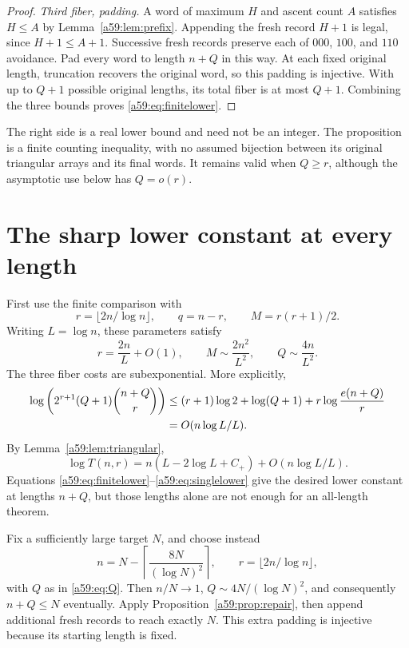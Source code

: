 \documentclass[11pt,letterpaper]{article}
\theoremstyle{remark}\newtheorem{remark}[theorem]{Remark}
\theoremstyle{remark}\newtheorem{wremark}{Remark}\renewcommand{\thewremark}{W\arabic{wremark}}
\theoremstyle{plain}\newtheorem{wcorollary}[wremark]{Corollary}
\begin{document}
\begin{proof}
\emph{Third fiber, padding.} A word of maximum $H$ and ascent count $A$ satisfies $H\le A$ by Lemma~\ref{a59:lem:prefix}. Appending the fresh record $H+1$ is legal, since $H+1\le A+1$. Successive fresh records preserve each of $000$, $100$, and $110$ avoidance. Pad every word to length $n+Q$ in this way. At each fixed original length, truncation recovers the original word, so this padding is injective. With up to $Q+1$ possible original lengths, its total fiber is at most $Q+1$. Combining the three bounds proves \eqref{a59:eq:finitelower}.
\end{proof}
The right side is a real lower bound and need not be an integer. The proposition is a finite counting inequality, with no assumed bijection between its original triangular arrays and its final words. It remains valid when $Q\ge r$, although the asymptotic use below has $Q=o(r)$.
\section{The sharp lower constant at every length}\label{a59:sec:lower}
First use the finite comparison with
\[
 r=\lfloor2n/\log n\rfloor,\qquad q=n-r,\qquad M=r(r+1)/2.
\]
Writing $L=\log n$, these parameters satisfy
\begin{equation}\label{a59:eq:optimparameters}
 r=\frac{2n}{L}+O(1),\qquad M\sim\frac{2n^2}{L^2},\qquad
 Q\sim\frac{4n}{L^2}.
\end{equation}
The three fiber costs are subexponential. More explicitly,
\begin{align}
 \log\left(2^{r+1}(Q+1)\binom{n+Q}{r}\right)
 &\le(r+1)\log2+\log(Q+1)
      +r\log\frac{e(n+Q)}r\notag\\
 &=O(n\log L/L).\label{a59:eq:lowercost}
\end{align}
By Lemma~\ref{a59:lem:triangular},
\begin{equation}\label{a59:eq:singlelower}
 \log T(n,r)=n(L-2\log L+C_+)+O(n\log L/L).
\end{equation}
Equations \eqref{a59:eq:finitelower}--\eqref{a59:eq:singlelower} give the desired lower constant at lengths $n+Q$, but those lengths alone are not enough for an all-length theorem.

Fix a sufficiently large target $N$, and choose instead
\begin{equation}\label{a59:eq:alllength}
 n=N-\left\lceil\frac{8N}{(\log N)^2}\right\rceil,
 \qquad r=\lfloor2n/\log n\rfloor,
\end{equation}
with $Q$ as in \eqref{a59:eq:Q}. Then $n/N\to1$, $Q\sim4N/(\log N)^2$, and consequently $n+Q\le N$ eventually. Apply Proposition~\ref{a59:prop:repair}, then append additional fresh records to reach exactly $N$. This extra padding is injective because its starting length is fixed.
\end{document}
